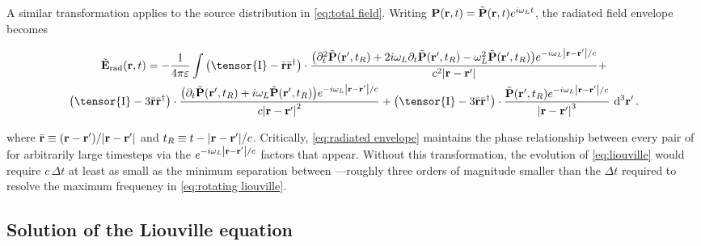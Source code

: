 A similar transformation applies to the source distribution in \cref{eq:total field}.
Writing $\vb{P}(\vb{r}, t) = \tilde{\vb{P}}(\vb{r}, t)e^{i \omega_L t}$, the radiated field envelope becomes
\begin{widetext}
\begin{equation}
  \begin{gathered}
    \tilde{\vb{E}}_\text{rad}(\vb{r}, t) = -\frac{1}{4\pi \varepsilon} \int
    \qty(\tensor{\mathrm{I}} -  \bar{\vb{r}}\bar{\vb{r}}^\dagger) \cdot \frac{\qty(\partial_t^2 \tilde{\vb{P}}(\vb{r}', t_R) + 2 i \omega_L \partial_t \tilde{\vb{P}}(\vb{r}', t_R) - \omega_L^2 \tilde{\vb{P}}(\vb{r}', t_R)) e^{-i \omega_L \abs{\vb{r} - \vb{r}'}/c}}{c^2 \abs{\vb{r}-\vb{r}'}} + \\
    \qty(\tensor{\mathrm{I}} - 3\bar{\vb{r}}\bar{\vb{r}}^\dagger) \cdot \frac{\qty(\partial_t \tilde{\vb{P}}(\vb{r}', t_R) + i \omega_L \tilde{\vb{P}}(\vb{r}', t_R))e^{-i \omega_L \abs{\vb{r} - \vb{r}'}/c}}{c \abs{\vb{r}-\vb{r}'}^2} +
    \qty(\tensor{\mathrm{I}} - 3\bar{\vb{r}}\bar{\vb{r}}^\dagger) \cdot \frac{                \tilde{\vb{P}}(\vb{r}', t_R) e^{-i \omega_L \abs{\vb{r} - \vb{r}'}/c}}{\abs{\vb{r}-\vb{r}'}^3}
    \, \dd[3]{\vb{r'}}.
  \end{gathered}
  \label{eq:radiated envelope}
\end{equation}
\end{widetext}
where $\bar{\vb{r}} \equiv \qty(\vb{r} - \vb{r}')/\abs{\vb{r} - \vb{r}'}$ and $t_R \equiv t - \abs{\vb{r} - \vb{r}'}/c$.
Critically, \cref{eq:radiated envelope} maintains the phase relationship between every pair of \qds{} for arbitrarily large timesteps via the $e^{-i \omega_L \abs{\vb{r} - \vb{r}'}/c}$ factors that appear.
Without this transformation, the evolution of \cref{eq:liouville} would require $c \, \Delta t$ at least as small as the minimum separation between \qds{}---roughly three orders of magnitude smaller than the $\Delta t$ required to resolve the maximum frequency in \cref{eq:rotating liouville}.

\subsection{Solution of the Liouville equation}

